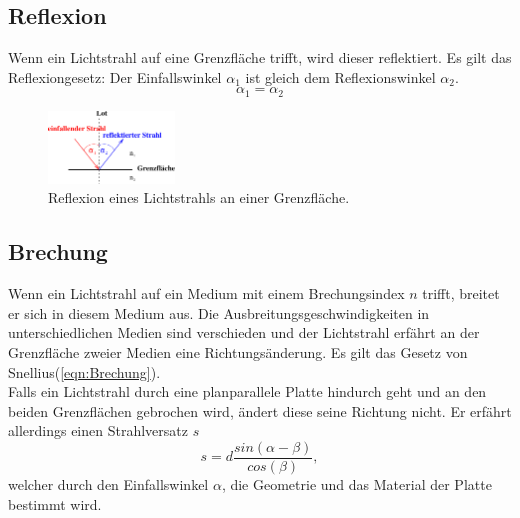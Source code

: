 \subsection{Reflexion}
\label{subsec:Reflexion}
    Wenn ein Lichtstrahl auf eine Grenzfläche trifft, wird  dieser reflektiert. 
    Es gilt das Reflexiongesetz:
    Der Einfallswinkel $\alpha_1$ ist gleich dem Reflexionswinkel $\alpha_2$.
    \begin{equation}
        \alpha_1 = \alpha_2
        \label{eqn:Reflexion}
    \end{equation}

    \begin{figure}[H]
        \centering
        \includegraphics[width=0.3\textwidth]{build/Abb_2a.pdf}
        \caption {Reflexion eines Lichtstrahls an einer Grenzfläche\cite[2]{V400}.}
        \label{fig:Abb_2a}
    \end{figure}

\subsection{Brechung}
\label{subsec:Brechung}
    Wenn ein Lichtstrahl auf ein Medium mit einem Brechungsindex $n$ trifft, breitet er sich in diesem Medium aus. 
    Die Ausbreitungsgeschwindigkeiten in unterschiedlichen Medien sind verschieden und der Lichtstrahl erfährt an der Grenzfläche zweier Medien eine Richtungsänderung.
    Es gilt das Gesetz von Snellius(\ref{eqn:Brechung}).\\
    Falls ein Lichtstrahl durch eine planparallele Platte hindurch geht und an den beiden Grenzflächen gebrochen wird, ändert diese seine Richtung nicht.
    Er erfährt allerdings einen Strahlversatz $s$
    \begin{equation}
        s = d\frac{sin(\alpha-\beta)}{cos(\beta)},
        \label{eqn:Strahlversatz}
    \end{equation}
    welcher durch den Einfallswinkel $\alpha$, die Geometrie und das Material der Platte bestimmt wird.

